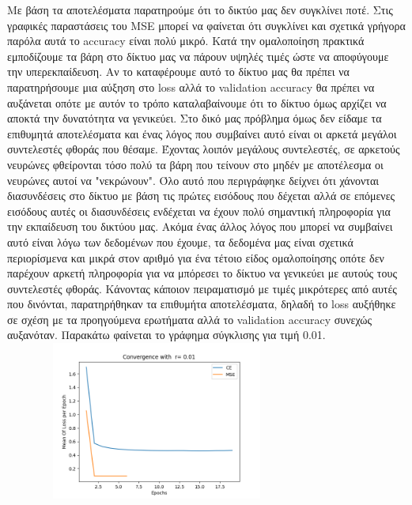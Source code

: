 \documentclass[12pt,a4paper]{article}
\newcommand{\tl}{\textlatin}
\begin{document}
        Με βάση τα αποτελέσματα παρατηρούμε ότι το δικτύο μας δεν συγκλίνει ποτέ. Στις γραφικές παραστάσεις του \tl{MSE} μπορεί να φαίνεται ότι συγκλίνει και σχετικά γρήγορα παρόλα αυτά το \tl{accuracy} είναι πολύ μικρό. Κατά την ομαλοποίηση πρακτικά εμποδίζουμε τα βάρη στο δίκτυο μας να πάρουν υψηλές τιμές ώστε να αποφύγουμε την υπερεκπαίδευση. Αν το καταφέρουμε αυτό το δίκτυο μας θα πρέπει να παρατηρήσουμε μια αύξηση στο \tl{loss} αλλά το \tl{validation} accuracy θα πρέπει να αυξάνεται οπότε με αυτόν το τρόπο καταλαβαίνουμε ότι το δίκτυο όμως αρχίζει να αποκτά την δυνατότητα να γενικεύει. Στο δικό μας πρόβλημα όμως δεν είδαμε τα επιθυμητά αποτελέσματα και ένας λόγος που συμβαίνει αυτό είναι οι αρκετά μεγάλοι συντελεστές φθοράς που θέσαμε. Έχοντας λοιπόν μεγάλους συντελεστές, σε αρκετούς νευρώνες φθείρονται τόσο πολύ τα βάρη που τείνουν στο μηδέν με αποτέλεσμα οι νευρώνες αυτοί να "νεκρώνουν". Όλο αυτό που περιγράφηκε δείχνει ότι χάνονται διασυνδέσεις στο δίκτυο με βάση τις πρώτες εισόδους που δέχεται αλλά σε επόμενες εισόδους αυτές οι διασυνδέσεις ενδέχεται να έχουν πολύ σημαντική πληροφορία για την εκπαίδευση του δικτύου μας. Ακόμα ένας άλλος λόγος που μπορεί να συμβαίνει αυτό είναι λόγω των δεδομένων που έχουμε, τα δεδομένα μας είναι σχετικά περιορίσμενα και μικρά στον αριθμό για ένα τέτοιο είδος ομαλοποίησης οπότε δεν παρέχουν αρκετή πληροφορία για να μπόρεσει το δίκτυο να γενικεύει με αυτούς τους συντελεστές φθοράς.
        Κάνοντας κάποιον πειραματισμό με τιμές μικρότερες από αυτές που δινόνται, παρατηρήθηκαν τα επιθυμήτα αποτελέσματα, δηλαδή το \tl{loss} αυξήθηκε σε σχέση με τα προηγούμενα ερωτήματα αλλά το \tl{validation} accuracy συνεχώς αυξανόταν. Παρακάτω φαίνεται το γράφημα σύγκλισης για τιμή 0.01.  
                   \includegraphics[width=10cm,height=5.2cm,left]{images/0.01.png}
\end{document}
